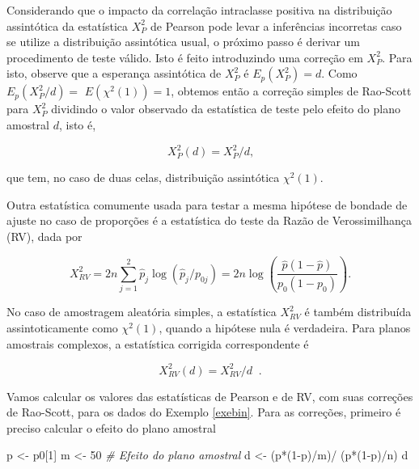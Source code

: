\documentclass[]{book}
\newenvironment{Shaded}{\begin{snugshade}}{\end{snugshade}}
\newcommand{\DecValTok}[1]{\textcolor[rgb]{0.00,0.00,0.81}{{#1}}}
\newcommand{\StringTok}[1]{\textcolor[rgb]{0.31,0.60,0.02}{{#1}}}
\newcommand{\CommentTok}[1]{\textcolor[rgb]{0.56,0.35,0.01}{\textit{{#1}}}}
\newcommand{\NormalTok}[1]{{#1}}
\numberwithin{example}{chapter}
\numberwithin{remark}{chapter}
\numberwithin{definition}{chapter}
\begin{document}
Considerando que o impacto da correlação intraclasse positiva na
distribuição assintótica da estatística \(X_{P}^{2}\) de Pearson pode
levar a inferências incorretas caso se utilize a distribuição
assintótica usual, o próximo passo é derivar um procedimento de teste
válido. Isto é feito introduzindo uma correção em \(X_{P}^{2}.\) Para
isto, observe que a esperança assintótica de \(X_{P}^{2}\) é
\(E_{p}\left( X_{P}^{2}\right) =d\). Como
\(E_{p}\left( X_{P}^{2}/d\right) =\)
\(E\left( \chi ^{2}\left( 1\right) \right)=1\), obtemos então a correção
simples de Rao-Scott para \(X_{P}^{2}\) dividindo o valor observado da
estatística de teste pelo efeito do plano amostral \(d\), isto é,

\begin{equation}
X_{P}^{2}(d)=X_{P}^{2}/d\mbox{,}  
\label{eq:qual3}
\end{equation}

que tem, no caso de duas celas, distribuição assintótica
\(\chi^{2}\left( 1\right)\).

Outra estatística comumente usada para testar a mesma hipótese de
bondade de ajuste no caso de proporções é a estatística do teste da
Razão de Verossimilhança (RV), dada por

\begin{equation}
X_{RV}^{2}=2n\sum\limits_{j=1}^{2}\widehat{p}_{j}\log \left( 
\widehat{p}_{j}/p_{0j}\right) =2n\log \left( \frac{\widehat{p}\left( 1-
\widehat{p}\right) }{p_{0}\left( 1-p_{0}\right) }\right) .
\label{eq:qual4}
\end{equation}

No caso de amostragem aleatória simples, a estatística \(X_{RV}^{2}\) é
também distribuída assintoticamente como \(\chi ^{2}\left(1\right)\),
quando a hipótese nula é verdadeira. Para planos amostrais complexos, a
estatística corrigida correspondente é

\begin{equation}
X_{RV}^{2}(d)=X_{RV}^{2}/d\;\;.  
\label{eq:qual5}
\end{equation}

Vamos calcular os valores das estatísticas de Pearson e de RV, com suas
correções de Rao-Scott, para os dados do Exemplo \ref{exebin}. Para as
correções, primeiro é preciso calcular o efeito do plano amostral

\begin{Shaded}
\begin{Highlighting}[]
\NormalTok{p <-}\StringTok{ }\NormalTok{p0[}\DecValTok{1}\NormalTok{]}
\NormalTok{m <-}\StringTok{ }\DecValTok{50}
\CommentTok{# Efeito do plano amostral}
\NormalTok{d <-}\StringTok{ }\NormalTok{(p*(}\DecValTok{1}\NormalTok{-p)/m)/}\StringTok{ }\NormalTok{(p*(}\DecValTok{1}\NormalTok{-p)/n)}
\NormalTok{d}
\end{Highlighting}
\end{Shaded}
\end{document}
